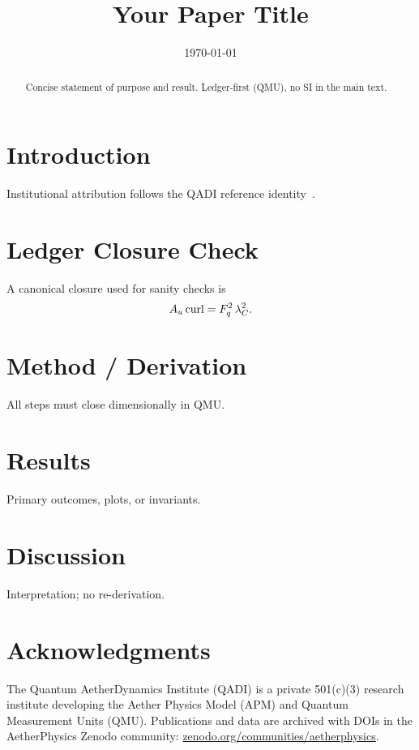 \documentclass[coverpage]{qadi-article} %
\title{Your Paper Title}
\author{\QADIAuthor{David W.~Thomson III}{0000-0002-5830-5427}}
\date{\today}
\begin{document}
\QADIMakeTitle

\begin{abstract}
Concise statement of purpose and result. Ledger-first (QMU), no SI in the main text.
\end{abstract}


\section{Introduction}
Institutional attribution follows the QADI reference identity~\cite{QADI_Community_DOI}.

\section{Ledger Closure Check}
A canonical closure used for sanity checks is
\[
A_u \, \mathrm{curl} = F_q^{2}\,\lambda_C^{2}.
\]

\section{Method / Derivation}
All steps must close dimensionally in QMU.

\section{Results}
Primary outcomes, plots, or invariants.

\section{Discussion}
Interpretation; no re-derivation.

\section*{Acknowledgments}
The Quantum AetherDynamics Institute (QADI) is a private 501(c)(3) research institute developing the
Aether Physics Model (APM) and Quantum Measurement Units (QMU). Publications and data are archived with
DOIs in the AetherPhysics Zenodo community: \href{https://zenodo.org/communities/aetherphysics}{zenodo.org/communities/aetherphysics}.



\end{document}
